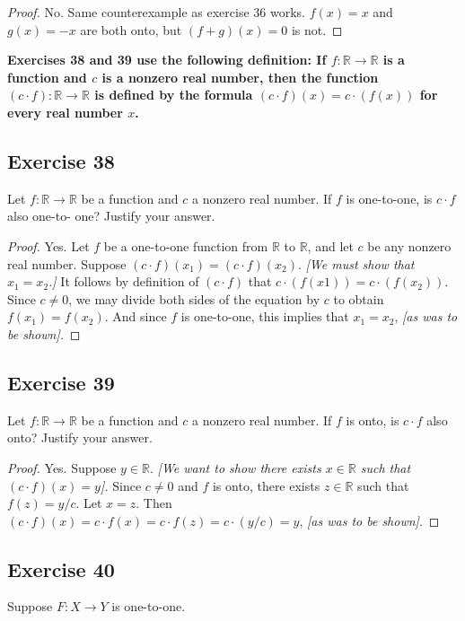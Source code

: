 \documentclass[14pt]{extarticle}
\newcommand{\R}{\mathbb{R}}
\newcommand{\cy}{\color{cyan}}
\begin{document}
\begin{proof}
    No. Same counterexample as exercise 36 works. \(f(x) = x\) and \(g(x) = -x\) are both onto, but \((f+g)(x) = 0\) is not.
\end{proof}

{\bf \cy Exercises 38 and 39 use the following definition: If \(f: \R \to \R\) is a function and $c$ is a nonzero real
number, then the function \((c \cdot f): \R \to \R\) is defined by the formula \((c \cdot f)(x) = c \cdot (f(x))\)
for every real number $x$.}

\subsection{Exercise 38}
Let \(f: \R \to \R\) be a function and $c$ a nonzero real number. If $f$ is one-to-one, is \(c \cdot f\) also one-to-
one? Justify your answer.

\begin{proof}
    Yes. Let $f$ be a one-to-one function from $\R$ to $\R$, and let $c$ be any nonzero real number. Suppose
    \((c \cdot f)(x_1) = (c \cdot f)(x_2)\). {\it [We must show that \(x_1 = x_2\).]} It follows by definition of
    \((c \cdot f)\) that \(c \cdot (f(x1)) = c \cdot (f(x_2))\). Since \(c \neq 0\), we may divide both sides of the
    equation by $c$ to obtain \(f(x_1) = f(x_2)\). And since $f$ is one-to-one, this implies that \(x_1 = x_2\),
    {\it [as was to be shown].}
\end{proof}

\subsection{Exercise 39}
Let \(f: \R \to \R\) be a function and $c$ a nonzero real number. If $f$ is onto, is \(c \cdot f\) also onto?
Justify your answer.

\begin{proof}
    Yes. Suppose \(y \in \R\). {\it [We want to show there exists \(x \in \R\) such that \((c \cdot f)(x) = y\)].}
    Since \(c \neq 0\) and $f$ is onto, there exists \(z \in \R\) such that \(f(z) = y/c\). Let $x = z$. Then
    \((c \cdot f)(x) = c \cdot f(x) = c \cdot f(z) = c \cdot (y/c) = y\), {\it [as was to be shown]}.
\end{proof}

\subsection{Exercise 40}
Suppose \(F: X \to Y\) is one-to-one.
\end{document}
